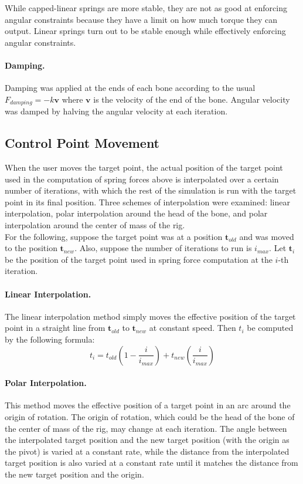 \documentclass[10pt,twocolumn,letterpaper]{article}
\begin{document}
While capped-linear springs are more stable, they are not as good at enforcing angular constraints because they have a limit on how much torque they can output. Linear springs turn out to be stable enough while effectively enforcing angular constraints. 

\paragraph{Damping.} Damping was applied at the ends of each bone according to the usual $F_{damping} = -k \bm{v}$ where $\bm{v}$ is the velocity of the end of the bone. Angular velocity was damped by halving the angular velocity at each iteration.

\subsection{Control Point Movement}

When the user moves the target point, the actual position of the target point used in the computation of spring forces above is interpolated over a certain number of iterations, with which the rest of the simulation is run with the target point in its final position. Three schemes of interpolation were examined: linear interpolation, polar interpolation around the head of the bone, and polar interpolation around the center of mass of the rig. \\

For the following, suppose the target point was at a position $\bm{t}_{old}$ and was moved to the position $\bm{t}_{new}$. Also, suppose the number of iterations to run is $i_{max}$. Let $\bm{t}_i$ be the position of the target point used in spring force computation at the $i$-th iteration.

\paragraph{Linear Interpolation.} The linear interpolation method simply moves the effective position of the target point in a straight line from $\bm{t}_{old}$ to $\bm{t}_{new}$ at constant speed. Then $t_i$ be computed by the following formula:
\[ t_i = t_{old} \left( 1 - \frac{i}{i_{max}} \right) + t_{new} \left( \frac{i}{i_{max}} \right) \]

\paragraph{Polar Interpolation.} This method moves the effective position of a target point in an arc around the origin of rotation. The origin of rotation, which could be the head of the bone of the center of mass of the rig, may change at each iteration. The angle between the interpolated target position and the new target position (with the origin as the pivot) is varied at a constant rate, while the distance from the interpolated target position is also varied at a constant rate until it matches the distance from the new target position and the origin.
\end{document}
